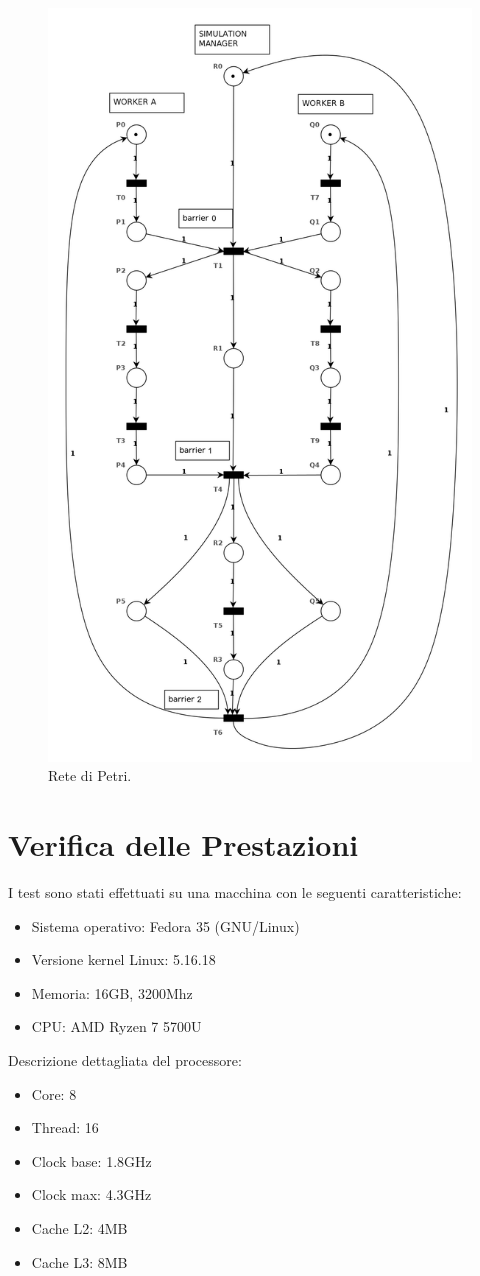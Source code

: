 \documentclass[12pt,a4paper,openright,twoside]{book}
\begin{document}
\begin{figure}
	\centering
	\includegraphics[width=0.7\linewidth]{figures/petri-net.png}
	\caption{Rete di Petri.}
	\label{fig:petri-net}
\end{figure}

\chapter{Verifica delle Prestazioni} %
\label{chap:Verifica delle Prestazioni}

I test sono stati effettuati su una macchina con le seguenti caratteristiche:
\begin{itemize}
	\item Sistema operativo: Fedora 35 (GNU/Linux)
	\item Versione kernel Linux: 5.16.18
	\item Memoria: 16GB, 3200Mhz
	\item CPU: AMD Ryzen 7 5700U
\end{itemize}
Descrizione dettagliata del processore:
\begin{itemize}
	\item Core: 8
	\item Thread: 16
	\item Clock base: 1.8GHz
	\item Clock max: 4.3GHz
	\item Cache L2: 4MB
	\item Cache L3: 8MB
\end{itemize}
\end{document}
